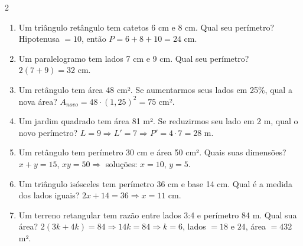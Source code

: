 \documentclass[11pt]{article}
\begin{document}
\begin{multicols}{2}
\begin{enumerate}
\item Um triângulo retângulo tem catetos 6 cm e 8 cm. Qual seu perímetro?  
{\color{red} Hipotenusa $=10$, então $P=6+8+10=24$ cm.}

\item Um paralelogramo tem lados 7 cm e 9 cm. Qual seu perímetro?  
{\color{red} $2(7+9)=32$ cm.}

\item Um retângulo tem área 48 cm². Se aumentarmos seus lados em 25\%, qual a nova área?  
{\color{red} $A_{novo}=48 \cdot (1,25)^2=75$ cm².}

\item Um jardim quadrado tem área 81 m². Se reduzirmos seu lado em 2 m, qual o novo perímetro?  
{\color{red} $L=9 \Rightarrow L'=7 \Rightarrow P'=4\cdot 7=28$ m.}

\item Um retângulo tem perímetro 30 cm e área 50 cm². Quais suas dimensões?  
{\color{red} $x+y=15$, $xy=50 \Rightarrow$ soluções: $x=10$, $y=5$.}

\item Um triângulo isósceles tem perímetro 36 cm e base 14 cm. Qual é a medida dos lados iguais?  
{\color{red} $2x+14=36 \Rightarrow x=11$ cm.}

\item Um terreno retangular tem razão entre lados 3:4 e perímetro 84 m. Qual sua área?  
{\color{red} $2(3k+4k)=84 \Rightarrow 14k=84 \Rightarrow k=6$, lados $=18$ e $24$, área $=432$ m².}

\end{enumerate}

\end{multicols}
\end{document}
